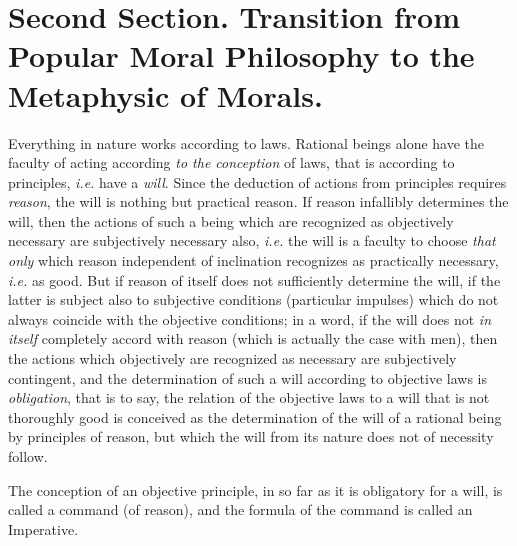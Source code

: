 \section{Second Section. Transition from Popular Moral Philosophy to
the Metaphysic of Morals.}


Everything in nature works according to laws. Rational beings
alone have the faculty of acting according \textit{to the conception}
of laws, that is according to principles, \textit{i.e.} have a
\textit{will}. Since the deduction of actions from principles requires
\textit{reason}, the will is nothing but practical reason. If reason
infallibly determines the will, then the actions of such a being which
are recognized as objectively necessary are subjectively necessary
also, \textit{i.e.} the will is a faculty to choose \textit{that only}
which reason independent of inclination recognizes as practically
necessary, \textit{i.e.} as good. But if reason of itself does not
sufficiently determine the will, if the latter is subject also to
subjective conditions (particular impulses) which do not always
coincide with the objective conditions; in a word, if the will does
not \textit{in itself} completely accord with reason (which is
actually the case with men), then the actions which objectively are
recognized as necessary are subjectively contingent, and the
determination of  such a will according to objective laws is
\textit{obligation}, that is to say, the relation of the objective
laws to a will that is not thoroughly good is conceived as the
determination of the will of a rational being by principles of reason,
but which the will from its nature does not of necessity follow.

The conception of an objective principle, in so far as it is
obligatory for a will, is called a command (of reason), and the
formula of the command is called an Imperative.

